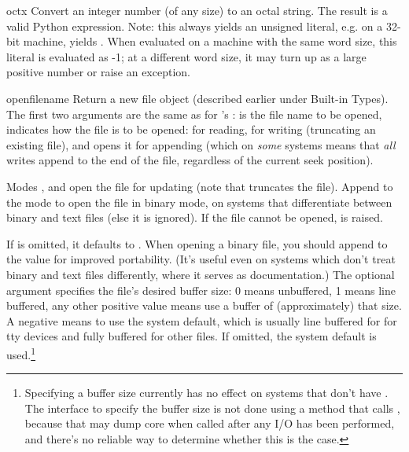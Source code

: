 \begin{funcdesc}{oct}{x}
  Convert an integer number (of any size) to an octal string.  The
  result is a valid Python expression.  Note: this always yields
  an unsigned literal, e.g. on a 32-bit machine,  yields
  .  When evaluated on a machine with the same
  word size, this literal is evaluated as -1; at a different word
  size, it may turn up as a large positive number or raise an
   exception.
\end{funcdesc}

\begin{funcdesc}{open}{filename}
  Return a new file object (described earlier under Built-in Types).
  The first two arguments are the same as for 's
  :  is the file name to be opened,
   indicates how the file is to be opened:  for
  reading,  for writing (truncating an existing file), and
   opens it for appending (which on \emph{some} \UNIX{}
  systems means that \emph{all} writes append to the end of the file,
  regardless of the current seek position).

  Modes ,  and  open the file for
  updating (note that  truncates the file).  Append
   to the mode to open the file in binary mode, on systems
  that differentiate between binary and text files (else it is
  ignored).  If the file cannot be opened,  is
  raised.

  If  is omitted, it defaults to .  When opening a 
  binary file, you should append  to the  value
  for improved portability.  (It's useful even on systems which don't
  treat binary and text files differently, where it serves as
  documentation.)
  The optional  argument specifies the
  file's desired buffer size: 0 means unbuffered, 1 means line
  buffered, any other positive value means use a buffer of
  (approximately) that size.  A negative  means to use
  the system default, which is usually line buffered for for tty
  devices and fully buffered for other files.  If omitted, the system
  default is used.\footnote{
    Specifying a buffer size currently has no effect on systems that
    don't have .  The interface to specify the
    buffer size is not done using a method that calls
    , because that may dump core when called
    after any I/O has been performed, and there's no reliable way to
    determine whether this is the case.}
\end{funcdesc}

